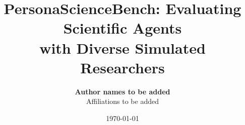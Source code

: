 \documentclass{aifrontiers}
\title{PersonaScienceBench: Evaluating Scientific Agents \\ with Diverse Simulated Researchers}
\author{
    {\bfseries Author names to be added} \\[0.45em]
    {\normalsize Affiliations to be added}
}
\date{\today}
\begin{document}
\begin{abstract}

\end{abstract}
\maketitle








\FloatBarrier
{}






\clearpage
\appendix

\end{document}
